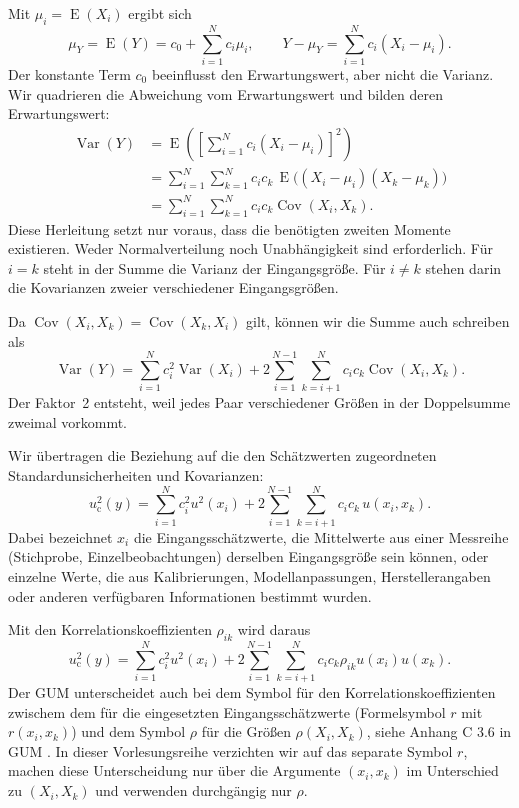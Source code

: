 Mit $\mu_i=\operatorname E(X_i)$ ergibt sich
\begin{equation}
\mu_Y=\operatorname E(Y)=c_0+\sum_{i=1}^N c_i\mu_i,
\qquad
Y-\mu_Y=\sum_{i=1}^N c_i(X_i-\mu_i).
\end{equation}
Der konstante Term $c_0$ beeinflusst den Erwartungswert, aber nicht die
Varianz. Wir quadrieren die Abweichung vom Erwartungswert und bilden deren
Erwartungswert:
\begin{equation}
\begin{aligned}
\operatorname{Var}(Y)
&=\operatorname E\!\left(\left[\sum_{i=1}^N c_i(X_i-\mu_i)\right]^2\right)\\
&=\sum_{i=1}^N\sum_{k=1}^N c_ic_k\,
\operatorname E\bigl((X_i-\mu_i)(X_k-\mu_k)\bigr)\\
&=\sum_{i=1}^N\sum_{k=1}^N c_ic_k\operatorname{Cov}(X_i,X_k).
\end{aligned}
\label{eq:VarianzSummeISTSummeKovarianz}
\end{equation}
Diese Herleitung setzt nur voraus, dass die benötigten zweiten Momente
existieren. Weder Normalverteilung noch Unabhängigkeit sind erforderlich.
Für $i=k$ steht in der Summe die Varianz der Eingangsgröße. Für $i\ne k$
stehen darin die Kovarianzen zweier verschiedener Eingangsgrößen.

Da $\operatorname{Cov}(X_i,X_k)=\operatorname{Cov}(X_k,X_i)$ gilt, können wir
die Summe auch schreiben als
\begin{equation}
\operatorname{Var}(Y)=
\sum_{i=1}^N c_i^2\operatorname{Var}(X_i)
+2\sum_{i=1}^{N-1}\sum_{k=i+1}^N
c_ic_k\operatorname{Cov}(X_i,X_k).
\label{univarLinearFortpflanzungKap7}
\end{equation}
Der Faktor~2 entsteht, weil jedes Paar verschiedener Größen in der
Doppelsumme zweimal vorkommt.

Wir übertragen die Beziehung auf die den Schätzwerten zugeordneten
Standardunsicherheiten und Kovarianzen:
\begin{equation}
\boxed{u_{\mathrm c}^2(y)=
\sum_{i=1}^N c_i^2u^2(x_i)
+2\sum_{i=1}^{N-1}\sum_{k=i+1}^N c_ic_k\,u(x_i,x_k).}
\label{UnsichFortpfl2}
\end{equation}
Dabei bezeichnet $x_i$ die Eingangsschätzwerte, die Mittelwerte aus einer Messreihe (Stichprobe, Einzelbeobachtungen) derselben Eingangsgröße sein können, oder einzelne Werte, die aus Kalibrierungen, Modellanpassungen, Herstellerangaben oder anderen verfügbaren Informationen bestimmt wurden.

Mit den Korrelationskoeffizienten $\rho_{ik}$ wird daraus
\begin{equation}
u_{\mathrm c}^2(y)=
\sum_{i=1}^N c_i^2u^2(x_i)
+2\sum_{i=1}^{N-1}\sum_{k=i+1}^N
c_ic_k \rho_{ik}u(x_i)u(x_k).
\label{FortpflaKorrStd}
\end{equation}
Der GUM unterscheidet auch bei dem Symbol für den Korrelationskoeffizienten zwischem dem für die eingesetzten Eingangsschätzwerte (Formelsymbol $r$ mit $r(x_i,x_k)$) und dem Symbol $\rho$ für die Größen $\rho(X_i,X_k)$, siehe Anhang C 3.6 in GUM \cite{GUM95}. In dieser Vorlesungsreihe verzichten wir auf das separate Symbol $r$, machen diese Unterscheidung nur über die Argumente $(x_i,x_k)$ im Unterschied zu $(X_i,X_k)$ und verwenden durchgängig nur $\rho$.

